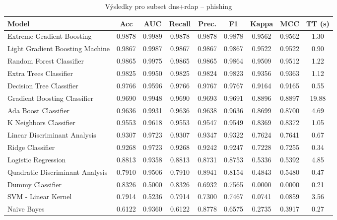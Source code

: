 \begin{table}[H]
  \centering
  \small
  \caption{Výsledky pro subset dns+rdap – phishing}
  \begin{tabular}{|l|c|c|c|c|c|c|c|c|}
    \hline
    \textbf{Model} & \textbf{Acc} & \textbf{AUC} & \textbf{Recall} & \textbf{Prec.} & \textbf{F1} & \textbf{Kappa} & \textbf{MCC} & \textbf{TT (s)} \\
    \hline
    Extreme Gradient Boosting & 0.9878 & 0.9989 & 0.9878 & 0.9878 & 0.9878 & 0.9562 & 0.9562 & 1.30 \\
    Light Gradient Boosting Machine & 0.9867 & 0.9987 & 0.9867 & 0.9867 & 0.9867 & 0.9522 & 0.9522 & 0.90 \\
    Random Forest Classifier & 0.9865 & 0.9975 & 0.9865 & 0.9865 & 0.9864 & 0.9509 & 0.9512 & 1.22 \\
    Extra Trees Classifier & 0.9825 & 0.9950 & 0.9825 & 0.9824 & 0.9823 & 0.9356 & 0.9363 & 1.12 \\
    Decision Tree Classifier & 0.9766 & 0.9596 & 0.9766 & 0.9767 & 0.9767 & 0.9164 & 0.9165 & 0.55 \\
    Gradient Boosting Classifier & 0.9690 & 0.9948 & 0.9690 & 0.9693 & 0.9691 & 0.8896 & 0.8897 & 19.88 \\
    Ada Boost Classifier & 0.9636 & 0.9931 & 0.9636 & 0.9638 & 0.9636 & 0.8699 & 0.8700 & 4.69 \\
    K Neighbors Classifier & 0.9553 & 0.9618 & 0.9553 & 0.9547 & 0.9549 & 0.8369 & 0.8372 & 1.05 \\
    Linear Discriminant Analysis & 0.9307 & 0.9723 & 0.9307 & 0.9347 & 0.9322 & 0.7624 & 0.7641 & 0.67 \\
    Ridge Classifier & 0.9268 & 0.9723 & 0.9268 & 0.9242 & 0.9247 & 0.7228 & 0.7255 & 0.34 \\
    Logistic Regression & 0.8813 & 0.9358 & 0.8813 & 0.8731 & 0.8753 & 0.5336 & 0.5392 & 4.85 \\
    Quadratic Discriminant Analysis & 0.7910 & 0.9506 & 0.7910 & 0.8941 & 0.8154 & 0.4843 & 0.5480 & 0.47 \\
    Dummy Classifier & 0.8326 & 0.5000 & 0.8326 & 0.6932 & 0.7565 & 0.0000 & 0.0000 & 0.21 \\
    SVM - Linear Kernel & 0.7914 & 0.5236 & 0.7914 & 0.7300 & 0.7467 & 0.0741 & 0.0859 & 3.56 \\
    Naive Bayes & 0.6122 & 0.9360 & 0.6122 & 0.8778 & 0.6575 & 0.2735 & 0.3917 & 0.27 \\
    \hline
  \end{tabular}
\end{table}
\vspace{0.5cm}

